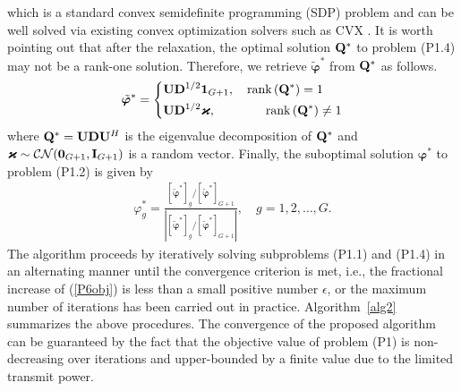 \documentclass[draftclsnofoot,onecolumn,12pt]{IEEEtran}
\begin{document}
which is a standard convex semidefinite programming (SDP) problem and can be well solved via existing convex optimization solvers such as CVX \cite{grant2014cvx}. It is worth pointing out that after the relaxation, the optimal solution ${\bf Q}^*$ to problem (P1.4) may not be a rank-one solution. Therefore, we retrieve
$\tilde{\bm \varphi}^*$ from ${\bf Q}^*$ as follows.
\begin{align}\label{Gaussian randomization}
\tilde{\bm \varphi}^*=\left\{ \begin{gathered}
{\bf U} {\bf D}^{1/2}{\bf 1}_{G+1},\quad \text{rank}\left({\bf Q}^*\right)=1 \hfill \\
{\bf U} {\bf D}^{1/2}{\bm \varkappa},\quad\quad\quad\quad \text{rank}\left({\bf Q}^*\right)\neq 1 \hfill
\end{gathered}  \right.
\end{align}
where ${\bf Q}^*={\bf U} {\bf D}{\bf U}^H$ is the eigenvalue decomposition of 
${\bf Q}^*$ and ${\bm \varkappa}\sim \mathcal{CN}( {\bf 0}_{G+1},{\bf I}_{G+1})$ is a random vector.
Finally, the suboptimal solution ${\bm \varphi}^*$ to problem (P1.2) is given by
\begin{align}\label{phase_shift}
{\varphi}_{g}^*=\frac{\left[\tilde{\bm \varphi}^*\right]_g{\Big /}\left[\tilde{\bm \varphi}^*\right]_{G+1}}
{\left|\left[\tilde{\bm \varphi}^*\right]_g{\Big /}\left[\tilde{\bm \varphi}^*\right]_{G+1}\right|},\quad g=1,2,\ldots,G .
\end{align}
The algorithm proceeds by iteratively solving subproblems (P1.1) and (P1.4) in an alternating manner until the convergence criterion is met, i.e., the fractional increase of (\ref{P6obj}) is less than a small positive number $\epsilon$, or the maximum number of iterations has been carried out in practice. 
Algorithm~\ref{alg2} summarizes the above procedures. 
	The convergence of the proposed algorithm can be guaranteed by the fact that the objective value of problem (P1) is non-decreasing over iterations and  upper-bounded by a finite value due to the limited transmit power. 
\end{document}
